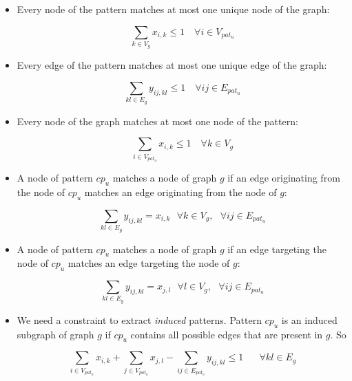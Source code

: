 \begin{itemize}
\item Every node of the pattern matches at most one unique node of the graph:

\begin{equation}
\sum_{k\in V_g}x_{i,k} \leq 1 \quad \forall i\in V_{pat_{u}}
\end{equation}

\item Every edge of the pattern matches at most one unique edge of the graph:

\begin{equation}
\sum_{kl\in E_g}y_{ij,kl} \leq 1 \quad \forall ij\in E_{pat_{u}}
\end{equation}

\item Every node of the graph matches at most one node of the pattern:

\begin{equation}
\sum_{i\in V_{pat_{u}}}x_{i,k} \leq 1 \quad \forall k\in V_g
\end{equation}

\item A node of pattern $cp_u$ matches a node of graph $g$ if an edge originating from the node of $cp_u$ matches an edge originating from the node of $g$:

\begin{equation}
\sum_{kl \in E_g}y_{ij,kl} =  x_{i,k}\textit{  }\forall k \in V_g, \textit{  }\forall ij \in E_{pat_{u}}
\end{equation}

\item A node of pattern $cp_u$ matches a node of graph $g$ if an edge targeting the node of $cp_u$ matches an edge targeting the node of $g$:

\begin{equation}
\sum_{kl \in E_g}y_{ij,kl} =  x_{j,l}\textit{  }\forall l \in V_g,\textit{  }\forall ij \in E_{pat_{u}}
\end{equation}

\item We need a constraint to extract \emph{induced} patterns. 
Pattern $cp_{u}$ is an induced subgraph of graph $g$ if $cp_{u}$ contains all possible edges that are present in $g$. 
So

\begin{equation}
\sum_{i \in V_{pat_{u}}}x_{i,k} + \sum_{j \in V_{pat_{u}}}x_{j,l} - \sum_{ij\in E_{pat_{u}}}y_{ij,kl} \leq 1
 \quad\textit{  }\forall kl\in E_g
\end{equation}
\end{itemize}

